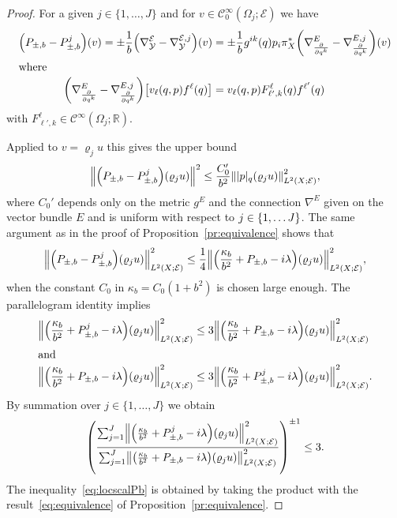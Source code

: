 \documentclass[AHL,Unicode,longabstracts]{cedram}
\newcommand{\R}{\mathbb{R}}
\newcommand{\clC}{\mathcal{C}}
\newcommand{\clY}{\mathcal{Y}}
\newcommand{\clE}{\mathcal{E}}
\let\originalleft\left
\let\originalright\right
\renewcommand{\left}{\mathopen{}\mathclose\bgroup\originalleft}
\renewcommand{\right}{\aftergroup\egroup\originalright}
\begin{document}
\begin{proof}
For a given $j\in \{1,\dots, J\}$ and for $v\in \clC^{\infty}_{0}(\Omega_{j};\clE)$ we have
\begin{align}
\left(P_{\pm,b} - P_{\pm,b}^j\right) (v) = \pm\frac{1}{b}\left(\nabla_{\clY}^{\clE}-\nabla^{\clE,j}_{\clY}\right)(v)
&=\pm\frac{1}{b} g^{ik}(q)p_{i}\pi_{X}^{*}\left(\nabla^{E}_{\frac{\partial}{\partial q^{k}}}-\nabla^{E,j}_{\frac{\partial}{\partial q^{k}}}\right)(v)
\\
\intertext{where}
\left(\nabla^{E}_{\frac{\partial}{\partial q^{k}}}-\nabla^{E,j}_{\frac{\partial}{\partial q^{k}}}\right)\left[v_{\ell}(q,p)f^{\ell}(q)\right]&=v_{\ell}(q,p)F^{\ell}_{\ell',k}(q)f^{\ell'}(q)
\end{align}
with $F^{\ell}_{\ell',k}\in \clC^{\infty}(\Omega_{j};\R)$.

Applied to $v=\varrho_{j}u$ this gives the upper bound
\[
\left\|\left(P_{\pm,b} - P_{\pm, b}^j\right)(\varrho_j u) \right\|^2 \leq \frac{C_0'}{b^2} \left\| |p|_q (\varrho_j u)\right\|_{L^{2}(X;\clE)}^2,
\]
where $C_0'$ depends only on the metric $g^E$ and the connection $\nabla^E$ given on the vector bundle $E$ and is uniform with respect to $j\in \left\{1,\dots J\right\}$. The same argument as in the proof of Proposition~\ref{pr:equivalence} shows that
\[
\left\| \left(P_{\pm,b} - P_{\pm,b}^j\right) (\varrho_j u) \right\|^2_{L^2(X;\clE)} \leq \frac{1}{4} \left\|\left(\frac{\kappa_b}{b^2}+ P_{\pm,b} -i \lambda\right) (\varrho_j u)\right\|^2_{L^2(X;\clE)},
\]
when the constant $C_{0}$ in $\kappa_{b}=C_{0}(1+b^{2})$ is chosen large enough. The parallelogram identity implies
\begin{align*}
\left\|\left(\frac{\kappa_b}{b^2}+ P_{\pm,b}^{j} -i \lambda\right) (\varrho_j u) \right\|^2_{L^2(X;\clE)} &\leq 3
\left\|\left(\frac{\kappa_b}{b^2}+ P_{\pm,b} -i \lambda\right) (\varrho_j u)\right\|^2_{L^2(X;\clE)}
\\
\intertext{and}
\left\|\left(\frac{\kappa_b}{b^2}+ P_{\pm,b} -i \lambda\right) (\varrho_j u)\right\|^2_{L^2(X;\clE)} &\leq 3
\left\|\left(\frac{\kappa_b}{b^2}+ P_{\pm,b}^{j} -i \lambda\right) (\varrho_j u)\right\|^2_{L^2(X;\clE)}.
\end{align*}
By summation over $j\in \{1,\dots,J\}$ we obtain
\[
\left(\frac{\sum_{j=1}^{J}\left\| \left(\frac{\kappa_b}{b^2}+ P_{\pm,b}^{j} -i \lambda\right) (\varrho_j u) \right\|^2_{L^2(X;\clE)}}{\sum_{j=1}^{J}\left\|\left(\frac{\kappa_b}{b^2}+ P_{\pm,b} -i \lambda\right) (\varrho_j u) \right\|^2_{L^2(X;\clE)}}\right)^{\pm 1}\leq 3.
\]
The inequality~\eqref{eq:locscalPb} is obtained by taking the product with the result~\eqref{eq:equivalence} of Proposition~\ref{pr:equivalence}.
\end{proof}
\end{document}
